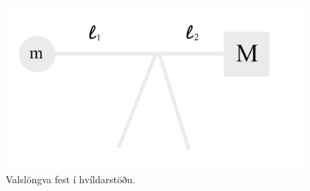 \ifdefined \wholebook \else\documentclass[oneside]{book}\usepackage{EdlBook}\graphicspath{{figures/}}
\begin{document}
\begin{enumerate}[label = \textbf{Dæmi \thechapter.\arabic*.}]
\begin{figure}[ht]
\begin{minipage}[b]{0.45\linewidth}
    \centering
    \includegraphics[scale=0.65]{images/massistong.png}
    \caption{Valslöngva fest í hvíldarstöðu.}
    \label{rest}
\end{minipage}
\hspace{0.5cm}
\begin{minipage}[b]{0.65\linewidth}
    \centering

\end{minipage}
\end{figure}
\end{enumerate}
\end{document}
